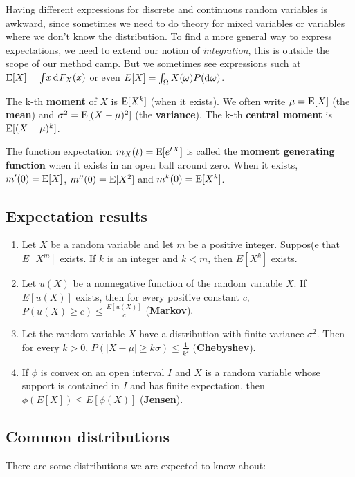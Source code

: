 \documentclass[twoside]{article}
\begin{document}
Having different expressions for discrete and continuous random variables is awkward, since
sometimes we need to do theory for mixed variables or variables where we don't know the 
distribution. To find a more general way to express expectations, we need to extend
our notion of \emph{integration}, this is outside the scope of our method camp. But we sometimes
see expressions such at $\E[X]=\int\! x \rd F_X(x)$
or even $E[X]=\int_\Omega X(\omega) P(\rd \omega)$.

The k-th \textbf{moment} of $X$ is $\operatorname{E} [X^k]$ (when it exists).  We often write $\mu=\operatorname{E}[X]$ (the \textbf{mean}) and
$\sigma^2 = \operatorname{E}[(X-\mu)^2]$ (the \textbf{variance}). The k-th \textbf{central moment} 
is $\operatorname{E} [ (X-\mu)^k]$.

The function expectation $m_X(t)=\operatorname{E}[e^{tX}]$ is called the \textbf{moment generating function}
when it exists in an open ball around zero. When it exists, $m'(0)=\operatorname{E}[X]$, $m''(0)=\operatorname{E}[X^2]$ and
$m^k(0)=\operatorname{E}[X^k]$.

\subsection{Expectation results}
\begin{enumerate}
\item Let $X$ be a random variable and let $m$ be a positive integer. 
Suppos(e that $E[X^m]$ exists. If $k$ is an integer and $k < m$, then
$E[X^k]$ exists.
\item Let $u(X)$ be a nonnegative function of the random variable $X$. If
$E[u(X)]$ exists, then for every positive constant $c$,
$P(u(X)\geq c) \leq \frac{E[u(X)]}{c}$ (\textbf{Markov}).
\item Let the random variable $X$ have a distribution with
finite variance $\sigma^2$. Then for every $k>0$, 
$P(|X-\mu|\geq k\sigma) \leq \frac{1}{k^2}$ (\textbf{Chebyshev}).
\item If $\phi$ is convex on an open interval $I$ and $X$ is a random
variable whose support is contained in $I$ and has finite expectation,
then $ \phi(E[X]) \leq E[\phi(X)]$ (\textbf{Jensen}).
\end{enumerate}

\subsection{Common distributions}
There are some distributions we are expected to know about:
\end{document}
